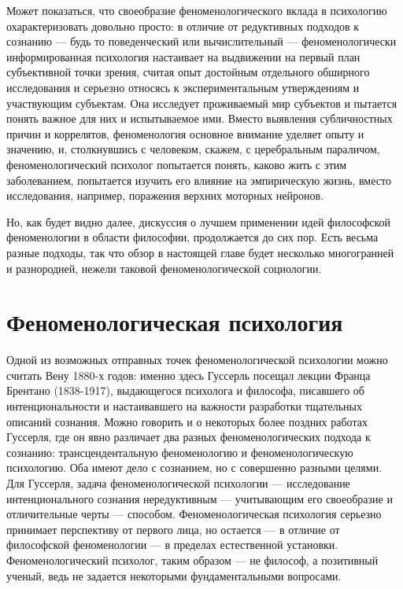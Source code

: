 \documentclass[11pt]{book}
\begin{document}
Может показаться, что своеобразие феноменологического вклада в психологию охарактеризовать довольно просто: в отличие от редуктивных подходов к сознанию --- будь то поведенческий или вычислительный --- феноменологически информированная психология настаивает на выдвижении на первый план субъективной точки зрения, считая опыт достойным отдельного обширного исследования и серьезно относясь к экспериментальным утверждениям и участвующим субъектам. Она исследует проживаемый мир субъектов и пытается понять важное для них и испытываемое ими. Вместо выявления субличностных причин и коррелятов, феноменология основное внимание уделяет опыту и значению, и, столкнувшись с человеком, скажем, с церебральным параличом, феноменологический психолог попытается понять, каково жить с этим заболеванием, попытается изучить его влияние на эмпирическую жизнь, вместо исследования, например, поражения верхних моторных нейронов.

Но, как будет видно далее, дискуссия о лучшем применении идей философской феноменологии в области философии, продолжается до сих пор. Есть весьма разные подходы, так что обзор в настоящей главе будет несколько многогранней и разнородней, нежели таковой феноменологической социологии.

\section{Феноменологическая психология}

Одной из возможных отправных точек феноменологической психологии можно считать Вену 1880-х годов: именно здесь Гуссерль посещал лекции Франца Брентано (1838-1917), выдающегося психолога и философа, писавшего об интенциональности и настаивавшего на важности разработки тщательных описаний сознания. Можно говорить и о некоторых более поздних работах Гуссерля, где он явно различает два разных феноменологических подхода к сознанию: трансцендентальную феноменологию и феноменологическую психологию. Оба имеют дело с сознанием, но с совершенно разными целями. Для Гуссерля, задача феноменологической психологии --- исследование интенционального сознания нередуктивным --- учитывающим его своеобразие и отличительные черты --- способом. Феноменологическая психология серьезно принимает перспективу от первого лица, но остается --- в отличие от философской феноменологии --- в пределах естественной установки. Феноменологический психолог, таким образом --- не философ, а позитивный ученый, ведь не задается некоторыми фундаментальными вопросами.
\end{document}
